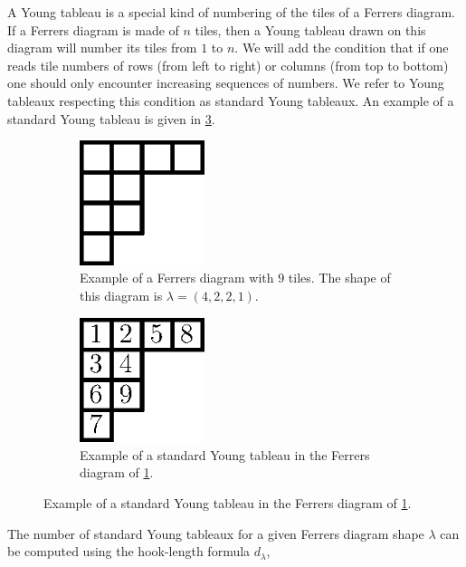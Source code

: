 A Young tableau is a special kind of numbering of the tiles of a Ferrers
diagram. If a Ferrers diagram is made of $n$ tiles, then a Young tableau drawn
on this diagram will number its tiles from $1$ to $n$. We will add the
condition that if one reads tile numbers of rows (from left to right) or
columns (from top to bottom) one should only encounter increasing sequences of
numbers. We refer to Young tableaux respecting this condition as standard Young
tableaux. An example of a standard Young tableau is given in
\ref{fig:xy:lattice:young}.

\begin{figure}
\centering
\begin{subfigure}[b]{0.49\textwidth}
\centering
	\includegraphics[width=0.4\textwidth]{fig/x+y/lattice/ferrers}
	\caption{Example of a Ferrers diagram with $9$ tiles. The shape of this
diagram is \(\lambda = (4,2,2,1)\).}
	\label{fig:xy:lattice:ferrers}
\end{subfigure}
\begin{subfigure}[b]{0.49\textwidth}
\centering
	\includegraphics[width=0.4\textwidth]{fig/x+y/lattice/young}
	\caption{Example of a standard Young tableau in the Ferrers diagram of
\ref{fig:xy:lattice:ferrers}.}
	\label{fig:xy:lattice:young}
\end{subfigure}
\end{figure}

The number of standard Young tableaux for a given Ferrers diagram shape
\(\lambda\) can be computed using the hook-length formula \(d_{\lambda}\),

